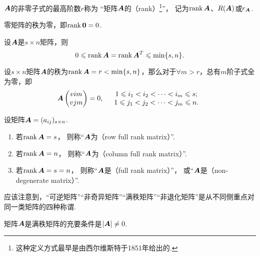 \begin{definition}\label{definition:线性方程组.矩阵的秩的定义}
\(\boldsymbol{A}\)的非零子式的最高阶数\(r\)称为
“矩阵\(\boldsymbol{A}\)的（rank）\footnote{
这种定义方式最早是由西尔维斯特于1851年给出的.}”，
记为\(\rank\boldsymbol{A}\)、\(R(\boldsymbol{A})\)或\(r_{\boldsymbol{A}}\).
\end{definition}

\begin{property}\label{theorem:线性方程组.矩阵的秩的性质1}
零矩阵的秩为零，即\(\rank\boldsymbol{0} = 0\).
\end{property}

\begin{property}\label{theorem:线性方程组.矩阵的秩的性质2}
设\(\boldsymbol{A}\)是\(s \times n\)矩阵，则\[
0 \leqslant \rank\boldsymbol{A} = \rank\boldsymbol{A}^T \leqslant \min\{s,n\}.
\]
\end{property}

\begin{property}\label{theorem:线性方程组.矩阵的秩的性质3}
设\(s \times n\)矩阵\(\boldsymbol{A}\)的秩为\(\rank\boldsymbol{A} = r < \min\{s,n\}\)，那么对于\(\forall m > r\)，总有\(m\)阶子式全为零，即\[
\boldsymbol{A}\begin{pmatrix}
v{i}{m} \\
v{j}{m}
\end{pmatrix} = 0,
\quad\begin{array}{c}
1 \leqslant i_1 < i_2 < \dotsb < i_m \leqslant s; \\
1 \leqslant j_1 < j_2 < \dotsb < j_m \leqslant n.
\end{array}
\]
\end{property}

\begin{definition}
设矩阵\(\boldsymbol{A} = (a_{ij})_{s \times n}\).
\begin{enumerate}
	\item 若\(\rank\boldsymbol{A} = s\)，
	则称“\(\boldsymbol{A}\)为（row full rank matrix）”.
	\item 若\(\rank\boldsymbol{A} = n\)，
	则称“\(\boldsymbol{A}\)为（column full rank matrix）”.
	\item 若\(\rank\boldsymbol{A} = s = n\)，
	则称“\(\boldsymbol{A}\)是（full rank matrix）”，
	或“\(\boldsymbol{A}\)是（non-degenerate matrix）”.
\end{enumerate}
\end{definition}

应该注意到，“可逆矩阵”“非奇异矩阵”“满秩矩阵”“非退化矩阵”是从不同侧重点对同一类矩阵的四种称谓.

\begin{property}\label{theorem:线性方程组.矩阵的秩的性质4}
矩阵\(\boldsymbol{A}\)是满秩矩阵的充要条件是\(\abs{\boldsymbol{A}}\neq0\).
\end{property}

